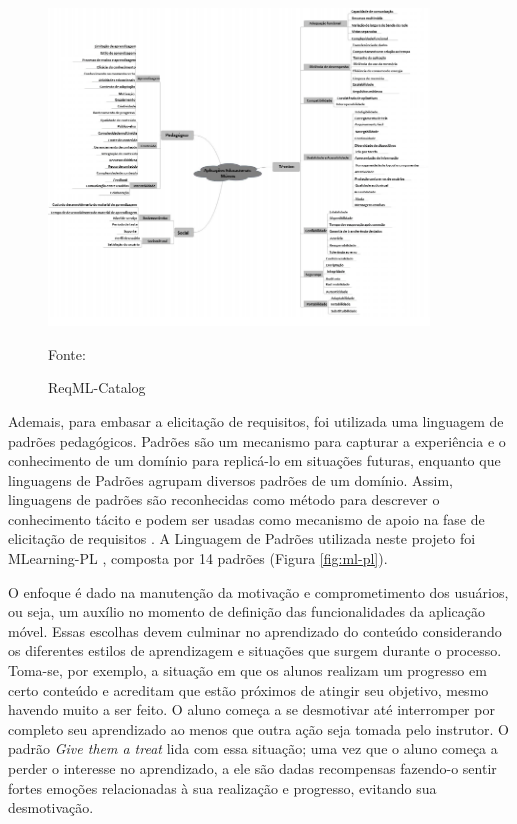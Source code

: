 \begin{figure}[H]
\centering
    \caption{ReqML-Catalog}
    \label{fig:reqML}
    \includegraphics[width=0.9\textwidth]{Figuras/reqML-catalog.png}
    
    Fonte: \cite{soad2017reqml}
\end{figure}

Ademais, para embasar a elicitação de requisitos, foi utilizada uma linguagem de padrões pedagógicos. Padrões são um mecanismo para capturar a experiência e o conhecimento de um domínio para replicá-lo em situações futuras, enquanto que linguagens de Padrões agrupam diversos padrões de um domínio. Assim, linguagens de padrões são reconhecidas como método para descrever o conhecimento tácito e podem ser usadas como mecanismo de apoio na fase de elicitação de requisitos
\citep{Pressman2014}. A Linguagem de Padrões utilizada neste projeto foi MLearning-PL \citep{Fioravanti2017_plop}, composta por 14 padrões (Figura \ref{fig:ml-pl}). 

O enfoque é dado na manutenção da motivação e comprometimento dos usuários, ou seja, um auxílio no momento de definição das funcionalidades da aplicação móvel. Essas escolhas devem culminar no aprendizado do conteúdo considerando os diferentes estilos de aprendizagem e situações que surgem durante o processo. Toma-se, por exemplo, a situação em que os alunos realizam um progresso em certo conteúdo e acreditam que estão próximos de atingir seu objetivo, mesmo havendo muito a ser feito. O aluno começa a se desmotivar até interromper por completo seu aprendizado ao menos que outra ação seja tomada pelo instrutor. O padrão \textit{Give them a treat} lida com essa situação; uma vez que o aluno começa a perder o interesse no aprendizado, a ele são dadas recompensas fazendo-o sentir fortes emoções relacionadas à sua realização e progresso, evitando sua desmotivação.

